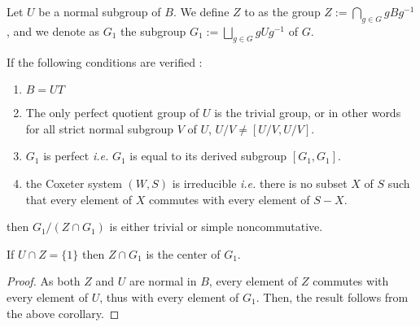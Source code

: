     Let $U$ be a normal subgroup of $B$. We define $Z$ to as the group $Z := \bigcap_{g \in G} g B g^{-1}$, and we denote as  $G_1$ the subgroup $G_1 := \bigsqcup_{g \in G} g U g^{-1}$ of $G$.

\begin{theoreme} \label{thm:simple}
If the following conditions are verified :
\begin{enumerate}
    \item \label{simple1} $B = UT$
    \item \label{simple2} The only perfect quotient group of $U$ is the trivial  group, or in other words for all strict normal subgroup $V$ of $U$,  $U / V \neq  [ U / V, U/V]$.
    \item \label{simple3}$G_1$ is perfect \textit{i.e. } $G_1$ is equal to its derived subgroup $[G_1,G_1]$.
    \item \label{simple4} the Coxeter system $\left( W,S \right)$ is irreducible \textit{i.e.} there is no subset $X$ of $S$ such that every element of $X$ commutes with every element of $S-X$.
\end{enumerate} 
    then $G_1 / \left( Z \cap G_1 \right)$ is either trivial or simple noncommutative.
\end{theoreme}

\begin{corollary} \label{cor:2}
    If $U \cap Z = \{1\}$ then $Z \cap G_1$ is the center of $G_1$.
\end{corollary}

\begin{proof}
    As both $Z$ and $U$ are normal in $B$, every element of $Z$ commutes with every element of $U$, thus with every element of $G_1$. Then, the result follows from the above corollary.
\end{proof}

